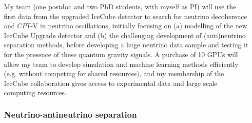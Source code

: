 \documentclass[a4paper,11pt]{article}
\begin{document}
My team (one postdoc and two PhD students, with myself as PI) will use the first data from the upgraded IceCube detector to search for neutrino decoherence and $CPT$-V in neutrino oscillations, initially focusing on (a) modelling of the new IceCube Upgrade detector and (b) the challenging development of (anti)neutrino separation methods, before developing a huge neutrino data sample and testing it for the presence of these quantum gravity signals. A purchase of 10 GPUs will allow my team to develop simulation and machine learning methods efficiently (e.g. without competing for shared resources), and my membership of the IceCube collaboration gives access to experimental data and large scale computing resources. \\








\subsubsection{Neutrino-antineutrino separation}
\end{document}
